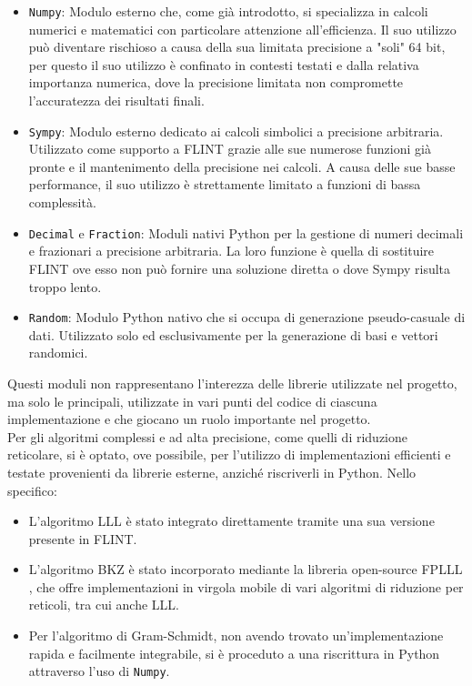 \begin{itemize}
    \item \texttt{Numpy}: Modulo esterno che, come già introdotto, si specializza in calcoli
    numerici e matematici con particolare attenzione all'efficienza. Il suo utilizzo può
    diventare rischioso a causa della sua limitata precisione a "soli" 64 bit, per questo 
    il suo utilizzo è confinato in contesti testati e dalla relativa importanza  numerica, 
    dove la precisione limitata non compromette l'accuratezza dei risultati finali.
    \item \texttt{Sympy}: Modulo esterno dedicato ai calcoli simbolici a precisione arbitraria.
    Utilizzato come supporto a FLINT grazie alle sue numerose funzioni già pronte e il 
    mantenimento della precisione nei calcoli. A causa delle sue basse performance, il suo
    utilizzo è strettamente limitato a funzioni di bassa complessità.
    \item \texttt{Decimal} e \texttt{Fraction}: Moduli nativi Python per la gestione di numeri decimali e 
    frazionari a precisione arbitraria. La loro funzione è quella di sostituire FLINT ove 
    esso non può fornire una soluzione diretta o dove Sympy risulta troppo lento.
    \item \texttt{Random}: Modulo Python nativo che si occupa di generazione pseudo-casuale di dati.
    Utilizzato solo ed esclusivamente per la generazione di basi e vettori randomici. 
\end{itemize}

Questi moduli non rappresentano l'interezza delle librerie utilizzate nel progetto, ma solo
le principali, utilizzate in vari punti del codice di ciascuna implementazione e che giocano
un ruolo importante nel progetto. \\
Per gli algoritmi complessi e ad alta precisione, come quelli di riduzione reticolare, 
si è optato, ove possibile, per l'utilizzo di implementazioni efficienti e testate 
provenienti da librerie esterne, anziché riscriverli in Python. 
Nello specifico:
\begin{itemize}
    \item L'algoritmo LLL è stato integrato direttamente tramite una sua versione presente in FLINT.
    \item L'algoritmo BKZ è stato incorporato mediante la libreria open-source FPLLL \cite{FPLLL}, 
    che offre implementazioni in virgola mobile di vari algoritmi di riduzione per reticoli, tra cui
    anche LLL.
    \item Per l'algoritmo di Gram-Schmidt, non avendo trovato un'implementazione rapida 
    e facilmente integrabile, si è proceduto a una riscrittura in Python attraverso l'uso 
    di \texttt{Numpy}.
\end{itemize}

